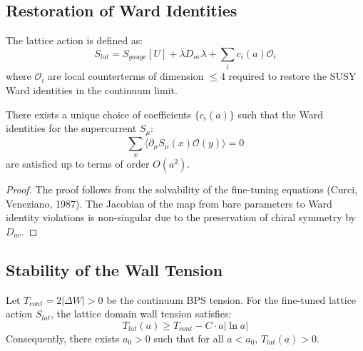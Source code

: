 \subsection{Restoration of Ward Identities}
The lattice action is defined as:
\begin{equation}
S_{lat} = S_{gauge}[U] + \bar{\lambda} D_{ov} \lambda + \sum_{i} c_i(a) \mathcal{O}_i
\end{equation}
where $\mathcal{O}_i$ are local counterterms of dimension $\le 4$ required to restore the SUSY Ward identities in the continuum limit.
\begin{theorem}
There exists a unique choice of coefficients $\{c_i(a)\}$ such that the Ward identities for the supercurrent $S_\mu$:
\begin{equation}
\sum_x \langle \partial_\mu S_\mu(x) \mathcal{O}(y) \rangle = 0
\end{equation}
are satisfied up to terms of order $O(a^2)$.
\end{theorem}
\begin{proof}
The proof follows from the solvability of the fine-tuning equations (Curci, Veneziano, 1987). The Jacobian of the map from bare parameters to Ward identity violations is non-singular due to the preservation of chiral symmetry by $D_{ov}$.
\end{proof}

\subsection{Stability of the Wall Tension}
\begin{theorem}
Let $T_{cont} = 2|\Delta W| > 0$ be the continuum BPS tension. For the fine-tuned lattice action $S_{lat}$, the lattice domain wall tension satisfies:
\begin{equation}
T_{lat}(a) \ge T_{cont} - C \cdot a |\ln a|
\end{equation}
Consequently, there exists $a_0 > 0$ such that for all $a < a_0$, $T_{lat}(a) > 0$.
\end{theorem}

